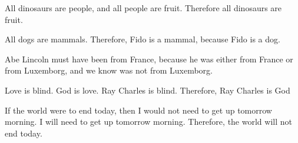 \begin{exercises}
\item All dinosaurs are people, and all people are fruit. Therefore all dinosaurs are fruit. 


\item All dogs are mammals. Therefore, Fido is a mammal, because Fido is a dog.  


\item Abe Lincoln must have been from France, because he was either from France or from Luxemborg, and we know was not from Luxemborg. 

\item Love is blind. God is love. Ray Charles is blind. Therefore, Ray Charles is God

\item If the world were to end today, then I would not need to get up tomorrow morning. I will need to get up tomorrow morning. Therefore, the world will not end today.


\end{exercises}
